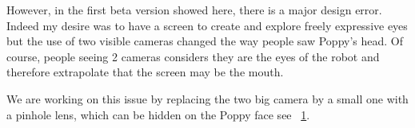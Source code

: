 However, in the first beta version showed here, there is a major design error. Indeed my desire was to have a screen to create and explore freely expressive eyes but the use of two visible cameras changed the way people saw Poppy's head. Of course, people seeing 2 cameras considers they are the eyes of the robot and therefore extrapolate that the screen may be the mouth.

We are working on this issue by replacing the two big camera by a small one with a pinhole lens, which can be hidden on the Poppy face see \figurename~\ref{fig:poppy_head_v1}.

\begin{figure}[tb]
\centering
    \caption{}
    \label{fig:poppy_head_v1}
\end{figure}
